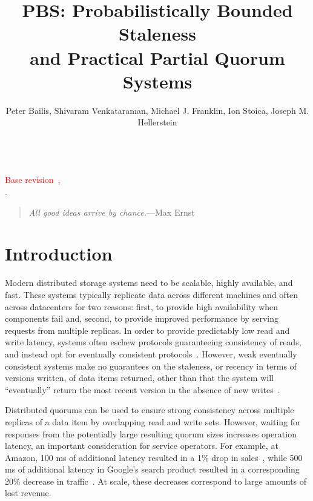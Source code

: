 \documentclass{vldb}
\title{PBS: Probabilistically Bounded Staleness\\ and Practical Partial Quorum Systems}
\author{Peter Bailis, Shivaram Venkataraman, Michael J. Franklin, Ion Stoica, Joseph M. Hellerstein\\
\affaddr{University of California, Berkeley}\\
\affaddr{\{pbailis, shivaram, franklin, stoica, hellerstein\}@cs.berkeley.edu}}
\newcommand{\sectionskip}{-0em}
\begin{document}

\maketitle


\noindent\textcolor{red}{Base revision~\GITAbrHash,~\GITAuthorDate\\\GITAuthorName.}

\begin{quote}
\textit{All good ideas arrive by chance.}---Max Ernst
\end{quote}



\vspace{\sectionskip}\section{Introduction}

Modern distributed storage systems need to be scalable, highly
available, and fast.  These systems typically replicate data across
different machines and often across datacenters for two reasons:
first, to provide high availability when components fail and, second,
to provide improved performance by serving requests from multiple
replicas.  In order to provide predictably low read and write latency,
systems often eschew protocols guaranteeing consistency of reads, and
instead opt for eventually consistent
protocols~\cite{cassandradefault, abadilatconsist, dynamo, feinbergpc,
  reddit, riaktalkone, outbrain}.  However, weak eventually consistent
systems make no guarantees on the staleness, or recency in terms of
versions written, of data items returned, other than that the system
will ``eventually'' return the most recent version in the absence of
new writes~\cite{vogels-defs}.

Distributed quorums can be used to ensure strong consistency across
multiple replicas of a data item by overlapping read and write
sets. However, waiting for responses from the potentially large
resulting quorum sizes increases operation latency, an important
consideration for service operators. For example, at Amazon, 100 ms of
additional latency resulted in a 1\% drop in
sales~\cite{amazon-latency}, while 500 ms of additional latency in
Google's search product resulted in a corresponding 20\% decrease in
traffic~\cite{google-talk}.  At scale, these decreases correspond to
large amounts of lost revenue.
\end{document}
